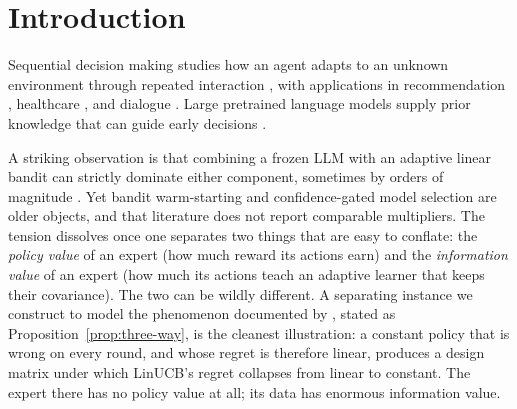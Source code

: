 \documentclass{article}
\theoremstyle{definition}
\theoremstyle{remark}
\theoremstyle{remark}
\begin{document}
\begin{abstract}
is the only expert-dependent part of the estimate at handoff, and which we
bound. A warm start therefore helps in two ways, through coverage and through
the transfer, and on real data the transfer is the larger. On AmazonCat-13K
three LLM experts of similar, low accuracy ($3.6$--$5.3\%$) raise the router's accuracy over cold LinUCB by
factors of $1.71$, $2.72$ and $3.29$, which is $6.5\%$, $16\%$ and $21\%$ less
regret. Coverage alone saves about $5\%$, the same for all three experts, as
the theory requires; the rest, and every significant difference between the
experts, comes from the transfer, and removing it by any of three independent
mechanisms collapses those differences. Which expert makes the better warm
start is decided by the residuals its choices carry, not by its accuracy.
\end{abstract}


\section{Introduction}
\label{sec:intro}

Sequential decision making studies how an agent adapts to an unknown
environment through repeated interaction \cite{zhu2022largeaction,zhu2022contextual},
with applications in recommendation \cite{li2010contextual,agarwal2016making},
healthcare \cite{tewari2017ads,svensson2023sequential}, and dialogue
\cite{li2016deep}. Large pretrained language models supply prior knowledge that
can guide early decisions
\cite{brown2020language,ouyang2022training,achiam2023gpt,
alamdari2024jumpstarting,abbasiyadkori2024believe}.

A striking observation is that combining a frozen LLM with an adaptive linear
bandit can strictly dominate either component, sometimes by orders of magnitude
\cite{chen2024llmdecision,huangcontextual}. Yet bandit warm-starting
\cite{bastani2021mostly,zhang2019warm} and confidence-gated model selection
\cite{auer2002nonstochastic,agarwal2017corralling,pacchiano2020model} are older
objects, and that literature does not report comparable multipliers. The
tension dissolves once one separates two things that are easy to conflate:
the \emph{policy value} of an expert (how much reward its actions earn) and
the \emph{information value} of an expert (how much its actions teach an
adaptive learner that keeps their covariance). The two can be wildly
different. A separating instance we construct to model the phenomenon
documented by \cite{chen2024llmdecision}, stated as
Proposition~\ref{prop:three-way}, is the cleanest illustration:
a constant policy that is wrong on every round, and whose regret is therefore
linear, produces a design matrix under which LinUCB's regret collapses from
linear to constant. The expert there has no policy value at all; its data has
enormous information value.
\end{document}
